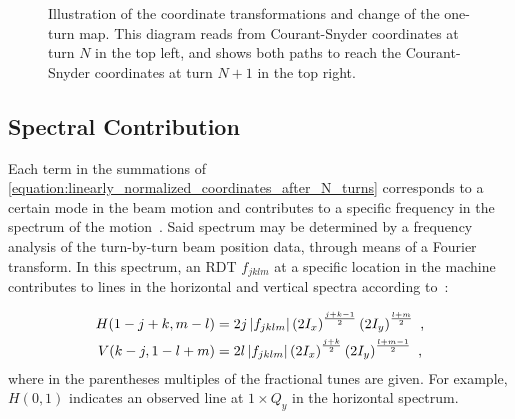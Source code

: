 \begin{figure}[!htb]
    \centering
    \caption{Illustration of the coordinate transformations and change of the one-turn map. This diagram reads from Courant-Snyder coordinates at turn \(N\) in the top left, and shows both paths to reach the Courant-Snyder coordinates at turn \(N+1\) in the top right.}
    \label{figure:coordinate_transformations}
\end{figure}

\subsection{Spectral Contribution}
\label{subsec:spectral_contribution}

Each term in the summations of \cref{equation:linearly_normalized_coordinates_after_N_turns} corresponds to a certain mode in the beam motion and contributes to a specific frequency in the spectrum of the motion~\cite{PHD:Bengtsson}.
Said spectrum may be determined by a frequency analysis of the turn-by-turn beam position data, through means of a Fourier transform.
In this spectrum, an \gls{RDT} \(f_{jklm}\) at a specific location in the machine contributes to lines in the horizontal and vertical spectra according to~\cite{PHD:Bengtsson,PRAB:Franchi:Emittance_Sharing_Coupling}:

\begin{equation}
    \begin{aligned}
        H(1-j+k, m-l) &= 2 j \left\lvert f_{jklm} \right\rvert \left( 2 I_x \right)^{\frac{j+k-1}{2}} \left( 2 I_y \right)^{\frac{l+m}{2}} \text{ ,}\\
        V(k-j, 1-l+m) &= 2 l \left\lvert f_{jklm} \right\rvert \left( 2 I_x \right)^{\frac{j+k}{2}} \left( 2 I_y \right)^{\frac{l+m-1}{2}} \text{ ,}
    \end{aligned}
    \label{equation:rdt_contribution_to_spectrum_line}
\end{equation}
where in the parentheses multiples of the fractional tunes are given.
For example, \(H(0,1)\) indicates an observed line at \(1 \times Q_y\) in the horizontal spectrum.

